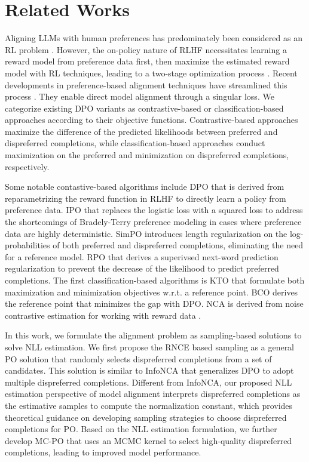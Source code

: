 

\section{Related Works}
\label{sec: related works}
Aligning LLMs with human preferences has predominately been considered as an RL problem \citep{ouyang2022training}.
However,
the on-policy nature of RLHF necessitates learning a reward model from preference data first,
then maximize the estimated reward model with RL techniques,
leading to a two-stage optimization process \citep{schulman2017proximal}.
Recent developments in preference-based alignment techniques have streamlined this process \citep{rafailov2024direct,azar2024general}.
They enable direct model alignment through a singular loss.
We categorize existing DPO variants as contrastive-based or classification-based approaches according to their objective functions.
Contrastive-based approaches maximize the difference of the predicted likelihoods between preferred and dispreferred completions,
while classification-based approaches conduct maximization on the preferred and minimization on dispreferred completions, respectively.

Some notable contastive-based algorithms include 
DPO \citep{rafailov2024direct}
that is derived from reparametrizing the reward function in RLHF to directly learn a policy from preference data.
IPO \citep{azar2024general} that replaces the logistic loss with a squared loss to address the shortcomings of Bradely-Terry preference modeling in cases where preference data are highly deterministic.
SimPO \citep{meng2024simpo} introduces length regularization on the log-probabilities of both preferred and dispreferred completions, eliminating the need for a reference model. 
RPO \citep{liu2024provably} that derives a superivsed next-word prediction regularization to prevent the decrease of the likelihood to predict preferred completions.
The first classification-based algorithms is
KTO \citep{ethayarajh2024kto} that formulate both maximization and minimization objectives w.r.t. a reference point.
BCO \citep{jung2024binary}
derives the reference point that minimizes the gap with DPO.
NCA \citep{chen2024noise} is derived from noise contrastive estimation for working with reward data \citep{gutmann2010noise}.

In this work, we formulate the alignment problem as sampling-based solutions to solve NLL estimation. 
We first propose the RNCE based sampling as a general PO solution that randomly selects dispreferred completions from a set of candidates.
This solution is similar to InfoNCA \citep{chen2024noise} that generalizes DPO to adopt multiple dispreferred completions. 
Different from InfoNCA, our proposed NLL estimation perspective of model alignment interprets dispreferred completions as the estimative samples to compute the normalization constant, which provides theoretical guidance on developing sampling strategies to choose dispreferred completions for PO.
Based on the NLL estimation formulation, we further develop MC-PO that uses an MCMC kernel to select high-quality dispreferred completions, leading to improved model performance.

